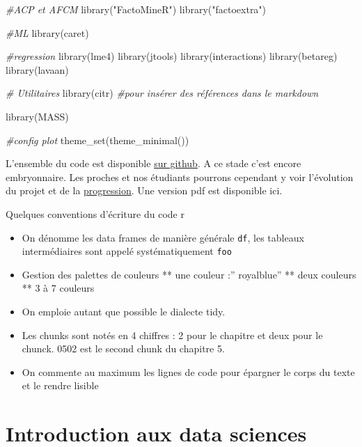 \documentclass[
]{book}
\newenvironment{Shaded}{\begin{snugshade}}{\end{snugshade}}
\newcommand{\CommentTok}[1]{\textcolor[rgb]{0.56,0.35,0.01}{\textit{#1}}}
\newcommand{\FunctionTok}[1]{\textcolor[rgb]{0.00,0.00,0.00}{#1}}
\newcommand{\NormalTok}[1]{#1}
\newcommand{\StringTok}[1]{\textcolor[rgb]{0.31,0.60,0.02}{#1}}
\providecommand{\tightlist}{%
  \setlength{\itemsep}{0pt}\setlength{\parskip}{0pt}}
\begin{document}
\begin{Shaded}
\begin{Highlighting}[]
\CommentTok{\#ACP et AFCM}
\FunctionTok{library}\NormalTok{(}\StringTok{"FactoMineR"}\NormalTok{)}
\FunctionTok{library}\NormalTok{(}\StringTok{"factoextra"}\NormalTok{)}

\CommentTok{\#ML}
\FunctionTok{library}\NormalTok{(caret)}

\CommentTok{\#regression}
\FunctionTok{library}\NormalTok{(lme4)}
\FunctionTok{library}\NormalTok{(jtools)}
\FunctionTok{library}\NormalTok{(interactions)}
\FunctionTok{library}\NormalTok{(betareg)}
\FunctionTok{library}\NormalTok{(lavaan)}

\CommentTok{\# Utilitaires}
\FunctionTok{library}\NormalTok{(citr) }\CommentTok{\#pour insérer des références dans le markdown}

\FunctionTok{library}\NormalTok{(MASS)}


\CommentTok{\#config plot}
\FunctionTok{theme\_set}\NormalTok{(}\FunctionTok{theme\_minimal}\NormalTok{())}
\end{Highlighting}
\end{Shaded}

L'ensemble du code est disponible \href{https://github.com/BenaventC/Datasciences}{sur github}. A ce stade c'est encore embryonnaire. Les proches et nos étudiants pourrons cependant y voir l'évolution du projet et de la \href{https://benaventc.github.io/Datascience/}{progression}. Une version pdf est disponible ici.

Quelques conventions d'écriture du code r

\begin{itemize}
\tightlist
\item
  On dénomme les data frames de manière générale \texttt{df}, les tableaux intermédiaires sont appelé systématiquement \texttt{foo}
\item
  Gestion des palettes de couleurs
  ** une couleur :'' royalblue''
  ** deux couleurs
  ** 3 à 7 couleurs
\item
  On emploie autant que possible le dialecte tidy.
\item
  Les chunks sont notés en 4 chiffres : 2 pour le chapitre et deux pour le chunck. 0502 est le second chunk du chapitre 5.
\item
  On commente au maximum les lignes de code pour épargner le corps du texte et le rendre lisible
\end{itemize}

\hypertarget{intro}{%
\chapter{Introduction aux data sciences}\label{intro}}
\end{document}
